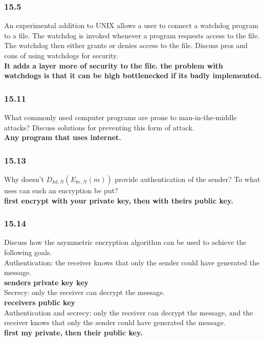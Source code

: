 \documentclass[a4paper,10pt,titlepage]{report}
\begin{document}
\subsubsection{15.5} An experimental addition to UNIX allows a user to connect a watchdog program to a file. The watchdog is invoked whenever a program requests access to the file. The watchdog then either grants or denies access to the file. Discuss pros and cons of using watchdogs for security.
\\ \hspace{10mm} \textbf{It adds a layer more of security to the file. the problem with watchdogs is that it can be high bottlenecked if its badly implemented.} \\


\subsubsection{15.11} What commonly used computer programs are prone to man-in-the-middle attacks? Discuss solutions for preventing this form of attack.
\\ \hspace{10mm} \textbf{Any program that uses internet.} \\



\subsubsection{15.13} Why doesn't $D_{kd,N}(E_{ke,N}(m)) $ provide authentication of the sender? To what uses can such an encryption be put?
\\ \hspace{10mm} \textbf{first encrypt with your private key, then with theirs public key.} \\



\subsubsection{15.14} Discuss how the asymmetric encryption algorithm can be used to achieve the following goals.\\
Authentication: the receiver knows that only the sender could have generated the message.
\\ \hspace{10mm} \textbf{senders private key key} \\
Secrecy: only the receiver can decrypt the message.
\\ \hspace{10mm} \textbf{receivers public key} \\
Authentication and secrecy: only the receiver can decrypt the message, and the receiver knows that only the sender could have generated the message.
\\ \hspace{10mm} \textbf{first my private, then their public key.} \\
\end{document}
